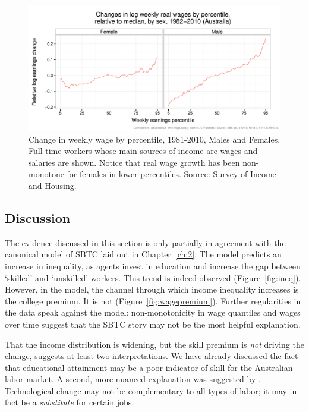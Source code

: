 \begin{figure}
  \centering
  \includegraphics[width=\textwidth]{../figure/quantile_mf.pdf}
  \caption{Change in weekly wage by percentile, 1981-2010, Males and Females. Full-time workers whose main sources of income are wages and salaries are shown. Notice that real wage growth has been non-monotone for females in lower percentiles. Source: Survey of Income and Housing.}
  \label{fig:banana}
\end{figure}

\subsection{Discussion}

The evidence discussed in this section is only partially in agreement with the canonical model of SBTC laid out in Chapter~\ref{ch:2}. The model predicts an increase in inequality, as agents invest in education and increase the gap between `skilled' and `unskilled' workers. This trend is indeed observed (Figure~\ref{fig:ineq}). However, in the model, the channel through which income inequality increases is the college premium. It is not (Figure~\ref{fig:wagepremium}). Further regularities in the data speak against the model: non-monotonicity in wage quantiles and wages over time suggest that the SBTC story may not be the most helpful explanation.

That the income distribution is widening, but the skill premium is {\em not} driving the change, suggests at least two interpretations. We have already discussed the fact that educational attainment may be a poor indicator of skill for the Australian labor market. A second, more nuanced explanation was suggested by \citet{Levy2003}. Technological change may not be complementary to all types of labor; it may in fact be a {\em substitute} for certain jobs.

